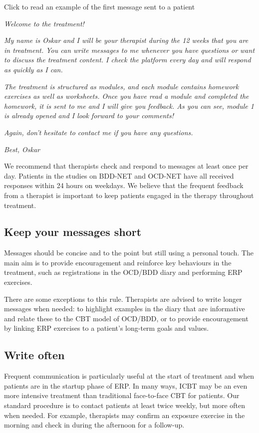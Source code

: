 \documentclass[]{book}
\theoremstyle{definition}
\theoremstyle{definition}
\theoremstyle{definition}
\theoremstyle{remark}
\begin{document}
 Click to read an example of the first message sent to a patient

\emph{Welcome to the treatment!}

\emph{My name is Oskar and I will be your therapist during the 12 weeks
that you are in treatment. You can write messages to me whenever you
have questions or want to discuss the treatment content. I check the
platform every day and will respond as quickly as I can.}

\emph{The treatment is structured as modules, and each module contains
homework exercises as well as worksheets. Once you have read a module
and completed the homework, it is sent to me and I will give you
feedback. As you can see, module 1 is already opened and I look forward
to your comments!}

\emph{Again, don't hesitate to contact me if you have any questions.}

\emph{Best, Oskar}

We recommend that therapists check and respond to messages at least once
per day. Patients in the studies on BDD-NET and OCD-NET have all
received responses within 24 hours on weekdays. We believe that the
frequent feedback from a therapist is important to keep patients engaged
in the therapy throughout treatment.

\hypertarget{keep-your-messages-short}{%
\subsection{Keep your messages short}\label{keep-your-messages-short}}

Messages should be concise and to the point but still using a personal
touch. The main aim is to provide encouragement and reinforce key
behaviours in the treatment, such as registrations in the OCD/BDD diary
and performing ERP exercises.

There are some exceptions to this rule. Therapists are advised to write
longer messages when needed: to highlight examples in the diary that are
informative and relate these to the CBT model of OCD/BDD, or to provide
encouragement by linking ERP exercises to a patient's long-term goals
and values.

\hypertarget{write-often}{%
\subsection{Write often}\label{write-often}}

Frequent communication is particularly useful at the start of treatment
and when patients are in the startup phase of ERP. In many ways, ICBT
may be an even more intensive treatment than traditional face-to-face
CBT for patients. Our standard procedure is to contact patients at least
twice weekly, but more often when needed. For example, therapists may
confirm an exposure exercise in the morning and check in during the
afternoon for a follow-up.
\end{document}
